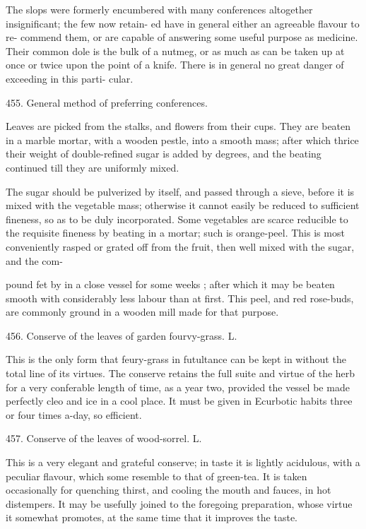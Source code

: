 \documentclass{article}
\begin{document}
The slops were formerly encumbered with many
conferences altogether insignificant; the few now retain-
ed have in general either an agreeable flavour to re-
commend them, or are capable of answering some
useful purpose as medicine. Their common dole is
the bulk of a nutmeg, or as much as can be taken up
at once or twice upon the point of a knife. There is
in general no great danger of exceeding in this parti-
cular.

455. General method of preferring conferences.

Leaves are picked from the stalks, and flowers from
their cups. They are beaten in a marble mortar,
with a wooden pestle, into a smooth mass; after
which thrice their weight of double-refined sugar is
added by degrees, and the beating continued till
they are uniformly mixed.

The sugar should be pulverized by itself, and passed through a sieve, before it is mixed with the vegetable mass; otherwise it cannot easily be reduced to sufficient fineness, so as to be duly incorporated. Some vegetables are scarce reducible to the requisite fineness by beating in a mortar; such is orange-peel. This is most conveniently rasped or grated off from the fruit, then well mixed with the sugar, and the com-

pound fet by in a close vessel for some weeks ; after
which it may be beaten smooth with considerably less
labour than at first. This peel, and red rose-buds,
are commonly ground in a wooden mill made for that
purpose.

456. Conserve of the leaves of garden fourvy-grass. L.

This is the only form that feury-grass in futultance
can be kept in without the total line of its virtues.
The conserve retains the full suite and virtue of the
herb for a very conferable length of time, as a year
two, provided the vessel be made perfectly cleo
and ice in a cool place. It must be given in Ecurbotic
habits three or four times a-day, so efficient.

457. Conserve of the leaves of wood-sorrel. L.

This is a very elegant and grateful conserve; in taste it is lightly acidulous, with a peculiar flavour, which some resemble to that of green-tea. It is taken occasionally for quenching thirst, and cooling the mouth and fauces, in hot distempers. It may be usefully joined to the foregoing preparation, whose virtue it somewhat promotes, at the same time that it improves the taste.
\end{document}
